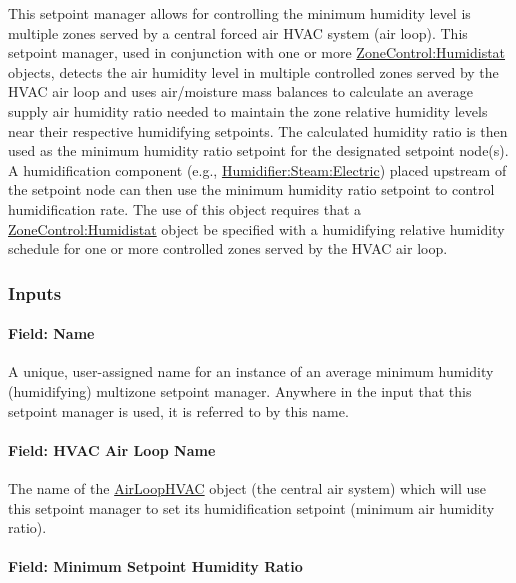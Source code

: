 This setpoint manager allows for controlling the minimum humidity level is multiple zones served by a central forced air HVAC system (air loop). This setpoint manager, used in conjunction with one or more \hyperref[zonecontrolhumidistat]{ZoneControl:Humidistat} objects, detects the air humidity level in multiple controlled zones served by the HVAC air loop and uses air/moisture mass balances to calculate an average supply air humidity ratio needed to maintain the zone relative humidity levels near their respective humidifying setpoints. The calculated humidity ratio is then used as the minimum humidity ratio setpoint for the designated setpoint node(s). A humidification component (e.g., \hyperref[humidifiersteamelectric]{Humidifier:Steam:Electric}) placed upstream of the setpoint node can then use the minimum humidity ratio setpoint to control humidification rate. The use of this object requires that a \hyperref[zonecontrolhumidistat]{ZoneControl:Humidistat} object be specified with a humidifying relative humidity schedule for one or more controlled zones served by the HVAC air loop.

\subsubsection{Inputs}\label{inputs-16-009}

\paragraph{Field: Name}\label{field-name-16-008}

A unique, user-assigned name for an instance of an average minimum humidity (humidifying) multizone setpoint manager. Anywhere in the input that this setpoint manager is used, it is referred to by this name.

\paragraph{Field: HVAC Air Loop Name}\label{field-hvac-air-loop-name-6}

The name of the \hyperref[airloophvac]{AirLoopHVAC} object (the central air system) which will use this setpoint manager to set its humidification setpoint (minimum air humidity ratio).

\paragraph{Field: Minimum Setpoint Humidity Ratio}\label{field-minimum-setpoint-humidity-ratio-1}


